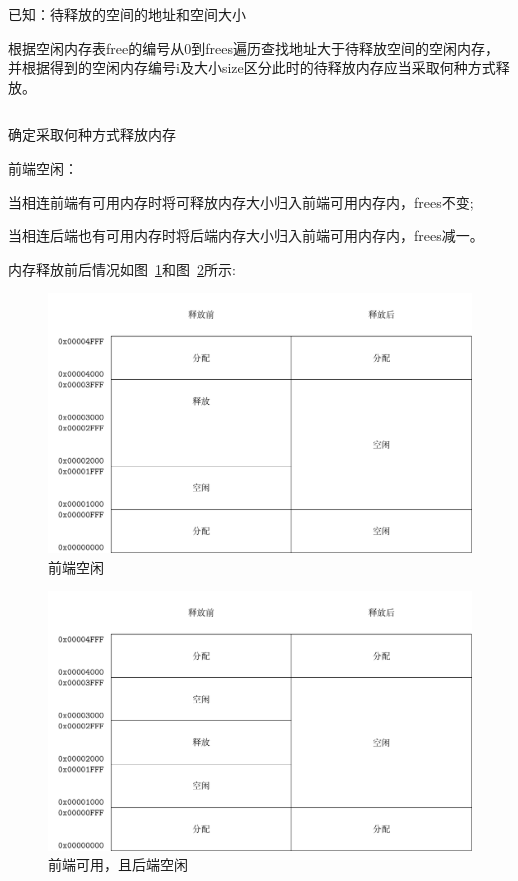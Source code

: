 已知：待释放的空间的地址和空间大小

根据空闲内存表free的编号从0到frees遍历查找地址大于待释放空间的空闲内存，
并根据得到的空闲内存编号i及大小size区分此时的待释放内存应当采取何种方式释放。
\begin{listing}[H]
  \inputminted[tabsize=2, firstline=91, lastline=95,
  linenos=true]{c}{../ZOS/src/kernel/memory.c}
  \caption{确定采取何种方式释放内存}
  \label{lst:rw}
\end{listing}

前端空闲：

当相连前端有可用内存时将可释放内存大小归入前端可用内存内，frees不变;

当相连后端也有可用内存时将后端内存大小归入前端可用内存内，frees减一。

\newpage
内存释放前后情况如图~\ref{fig:mem0}和图~\ref{fig:mem1}所示: 

\begin{figure}[h]
  \centering
  \includegraphics[width=.8\textwidth]{fig/mem0.pdf}
  \caption{前端空闲}
  \label{fig:mem0}
\end{figure}

\begin{figure}[h]
  \centering
  \includegraphics[width=.8\textwidth]{fig/mem1.pdf}
  \caption{前端可用，且后端空闲}
  \label{fig:mem1}
\end{figure}

